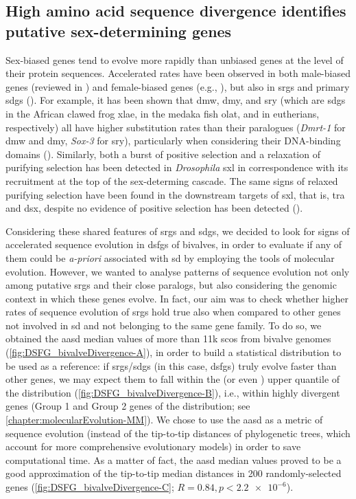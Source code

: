 \subsection{High amino acid sequence divergence identifies putative sex-determining genes}
Sex-biased genes tend to evolve more rapidly than unbiased genes at the level of their protein sequences. Accelerated rates have been observed in both male-biased genes (reviewed in ) and female-biased genes (e.g., ), but also in \glspl{srg} and primary \glspl{sdg} (). For example, it has been shown that \gls{dmw}, \gls{dmy}, and \gls{sry} (which are \glspl{sdg} in the African clawed frog \gls{xlae}, in the medaka fish \gls{olat}, and in eutherians, respectively) all have higher substitution rates than their paralogues (\textit{Dmrt-1} for \gls{dmw} and \gls{dmy}, \textit{Sox-3} for \gls{sry}), particularly when considering their DNA-binding domains (). Similarly, both a burst of positive selection and a relaxation of purifying selection has been detected in \textit{Drosophila} \gls{sxl} in correspondence with its recruitment at the top of the sex-determing cascade. The same signs of relaxed purifying selection have been found in the downstream targets of \gls{sxl}, that is, \gls{tra} and \gls{dsx}, despite no evidence of positive selection has been detected ().

Considering these shared features of \glspl{srg} and \glspl{sdg}, we decided to look for signs of accelerated sequence evolution in \glspl{dsfg} of bivalves, in order to evaluate if any of them could be \textit{a-priori} associated with \gls{sd} by employing the tools of molecular evolution. However, we wanted to analyse patterns of sequence evolution not only among putative \glspl{srg} and their close paralogs, but also considering the genomic context in which these genes evolve. In fact, our aim was to check whether higher rates of sequence evolution of \glspl{srg} hold true also when compared to other genes not involved in \gls{sd} and not belonging to the same gene family. To do so, we obtained the \gls{aasd} median values of more than 11k \glspl{sco} from bivalve genomes (\cref{fig:DSFG_bivalveDivergence-A}), in order to build a statistical distribution to be used as a reference: if \glspl{srg}/\glspl{sdg} (in this case, \glspl{dsfg}) truly evolve faster than other genes, we may expect them to fall within the \fivepercent (or even \onepercent) upper quantile of the distribution (\cref{fig:DSFG_bivalveDivergence-B}), i.e., within highly divergent genes (Group 1 and Group 2 genes of the distribution; see \cref{chapter:molecularEvolution-MM}). We chose to use the \gls{aasd} as a metric of sequence evolution (instead of the tip-to-tip distances of phylogenetic trees, which account for more comprehensive evolutionary models) in order to save computational time. As a matter of fact, the \gls{aasd} median values proved to be a good approximation of the tip-to-tip median distances in 200 randomly-selected genes (\cref{fig:DSFG_bivalveDivergence-C}; $R = 0.84, p < \num{2.2e-6}$).

